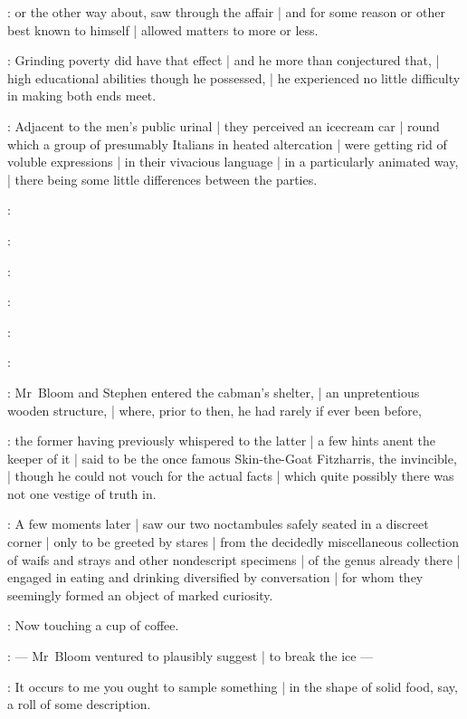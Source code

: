 :
or the other way about, saw through the affair |
and for some reason or other best known to himself |
allowed matters to more or less.

:
Grinding poverty did have that effect |
and he more than conjectured that, |
high educational abilities though he possessed, |
he experienced no little difficulty in making both ends meet.

:
Adjacent to the men's public urinal |
they perceived an icecream car |
round which a group of presumably Italians in heated altercation |
were getting rid of voluble expressions |
in their vivacious language |
in a particularly animated way, |
there being some little differences between the parties.

:

:

:

:

:

:

:
Mr~Bloom and Stephen entered the cabman's shelter, |
an unpretentious wooden structure, |
where, prior to then, he had rarely if ever been before,

:
the former having previously whispered to the latter |
a few hints anent the keeper of it |
said to be the once famous Skin-the-Goat Fitzharris, the invincible, |
though he could not vouch for the actual facts |
which quite possibly there was not one vestige of truth in.

:
A few moments later |
saw our two noctambules safely seated in a discreet corner |
only to be greeted by stares |
from the decidedly miscellaneous collection
of waifs and strays and other nondescript specimens |
of the genus  already there |
engaged in eating and drinking diversified by conversation |
for whom they seemingly formed an object of marked curiosity.

\Bloom:
Now touching a cup of coffee.

:
    --- Mr~Bloom ventured to plausibly suggest |
        to break the ice ---

\Bloom:
It occurs to me you ought to sample something |
in the shape of solid food, say, a roll of some description.


